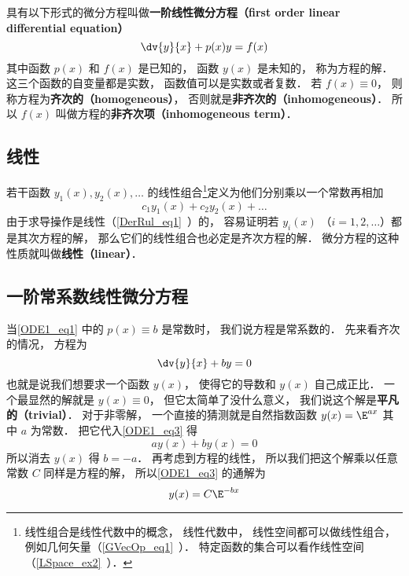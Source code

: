 
\begin{issues}
\issueNeedCite
{}
\end{issues}


具有以下形式的微分方程叫做\textbf{一阶线性微分方程（first order linear differential equation）}
\begin{equation}\label{ODE1_eq1}
\dv{y}{x} + p(x)y = f(x)
\end{equation}
其中函数 $p(x)$ 和 $f(x)$ 是已知的， 函数 $y(x)$ 是未知的， 称为方程的解． 这三个函数的自变量都是实数， 函数值可以是实数或者复数． 若 $f(x) \equiv 0$， 则称方程为\textbf{齐次的（homogeneous）}， 否则就是\textbf{非齐次的（inhomogeneous）}． 所以 $f(x)$ 叫做方程的\textbf{非齐次项（inhomogeneous term）}．

\subsection{线性}
若干函数 $y_1(x), y_2(x), \dots$ 的线性组合\footnote{线性组合是线性代数中的概念， 线性代数中， 线性空间都可以做线性组合， 例如几何矢量（\autoref{GVecOp_eq1}~）． 特定函数的集合可以看作线性空间（\autoref{LSpace_ex2}~）．}定义为他们分别乘以一个常数再相加
\begin{equation}
c_1 y_1(x) + c_2 y_2(x) + \dots
\end{equation}
由于求导操作是线性（\autoref{DerRul_eq1}~）的， 容易证明若 $y_i(x)$ （$i = 1, 2,\dots$）都是其次方程的解， 那么它们的线性组合也必定是齐次方程的解． 微分方程的这种性质就叫做\textbf{线性（linear）}．

\subsection{一阶常系数线性微分方程}
当\autoref{ODE1_eq1} 中的 $p(x) \equiv b$ 是常数时， 我们说方程是常系数的． 先来看齐次的情况， 方程为
\begin{equation}\label{ODE1_eq3}
\dv{y}{x} + by = 0
\end{equation}
也就是说我们想要求一个函数 $y(x)$， 使得它的导数和 $y(x)$ 自己成正比． 一个最显然的解就是 $y(x) \equiv 0$， 但它太简单了没什么意义， 我们说这个解是\textbf{平凡的（trivial）}． 对于非零解， 一个直接的猜测就是自然指数函数 $y(x) = \E^{ax}$ 其中 $a$ 为常数． 把它代入\autoref{ODE1_eq3} 得
\begin{equation}
ay(x) + by(x) = 0
\end{equation}
所以消去 $y(x)$ 得 $b = -a$． 再考虑到方程的线性， 所以我们把这个解乘以任意常数 $C$ 同样是方程的解， 所以\autoref{ODE1_eq3} 的通解为
\begin{equation}
y(x) = C\E^{-bx}
\end{equation}

